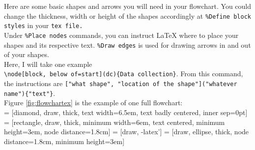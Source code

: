 Here are some basic shapes and arrows you will need in your flowchart. You could change the thickness, width or height of the shapes accordingly at \verb+%Define block styles+ in your \verb+tex file.+\\

Under \verb+%Place nodes+ commands, you can instruct {\LaTeX} where to place your shapes and its respective text. \verb+%Draw edges+ is used for drawing arrows in and out of your shapes.\\

Here, I will take one example\\

\verb+\node[block, below of=start](dc){Data collection}+. From this command, the instructions are \verb+["what shape", "location of the shape"]("whatever name"){"text"}+.\\

Figure \ref{fig:flowchartex} is the example of one full flowchart:\\

 = [diamond, draw, thick, 
    text width=6.5em, text badly centered, inner sep=0pt]
 = [rectangle, draw, thick, minimum width=6em, text centered, minimum height=3em,
node distance=1.8cm]
 = [draw, -latex']
 = [draw, ellipse, thick, node distance=1.8cm,
    minimum height=3em]

